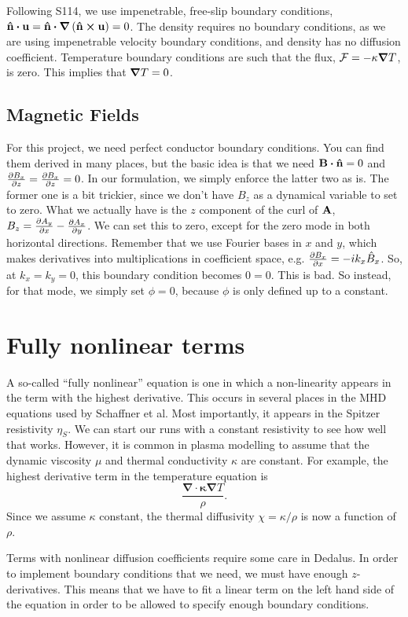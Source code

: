 \documentclass{jpp}
\newcommand{\vnorm}{\vb{\hat{n}}}
\begin{document}
Following S114, we use impenetrable, free-slip boundary conditions, $\vnorm \vdot \vb{u} = \vnorm \vdot \grad{\left(\vnorm \cross \vb{u}\right)} = 0$. The density requires no boundary conditions, as we are using impenetrable velocity boundary conditions, and density has no diffusion coefficient. Temperature boundary conditions are such that the flux, $\mathcal{F} = -\kappa \grad{T}$, is zero. This implies that $\grad{T} = 0$.


\subsection{Magnetic Fields}
\label{sec:B_bc}

For this project, we need perfect conductor boundary conditions. You can find them derived in many places, but the basic idea is that we need $\vb{B} \vdot \vnorm = 0$ and $\pdv{B_x}{z} = \pdv{B_x}{z} = 0$. In our formulation, we simply enforce the latter two as is. The former one is a bit trickier, since we don't have $B_z$ as a dynamical variable to set to zero. What we actually have is the $z$ component of the curl of $\vb{A}$, $B_z = \pdv{A_y}{x} - \pdv{A_x}{y}$. We can set this to zero, except for the zero mode in both horizontal directions. Remember that we use Fourier bases in $x$ and $y$, which makes derivatives into multiplications in coefficient space, e.g. $\pdv{B_x}{x} = -i k_x \hat{B}_x$. So, at $k_x = k_y = 0$, this boundary condition becomes $0 = 0$. This is bad. So instead, for that mode, we simply set $\phi = 0$, because $\phi$ is only defined up to a constant.


\section{Fully nonlinear terms}
\label{sec:fully_nonlinear} 

A so-called ``fully nonlinear'' equation is one in which a non-linearity appears in the term with the highest derivative. This occurs in several places in the MHD equations used by Schaffner et al. Most importantly, it appears in the Spitzer resistivity $\eta_S$. We can start our runs with a constant resistivity to see how well that works. However, it is common in plasma modelling to assume that the dynamic viscosity $\mu$ and thermal conductivity $\kappa$ are constant. For example, the highest derivative term in the temperature equation is
\begin{equation}
  \label{eq:heat_diff}
 \frac{\mathbf{\nabla \cdot \kappa \nabla} T}{\rho}.
\end{equation}
Since we assume $\kappa$ constant, the thermal diffusivity $\chi = \kappa/\rho$ is now a function of $\rho$. 


Terms with nonlinear diffusion coefficients require some care in Dedalus. In order to implement boundary conditions that we need, we must have enough $z$-derivatives. This means that we have to fit a linear term on the left hand side of the equation in order to be allowed to specify enough boundary conditions.




\end{document}
